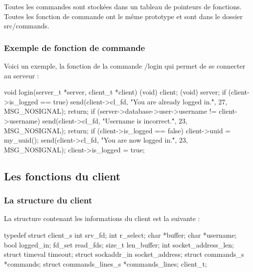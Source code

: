 \documentclass{report}
\begin{document}
Toutes les commandes sont stockées dans un tableau de pointeurs de fonctions. Toutes les fonction de commande ont le même prototype et sont dans le dossier src/commands.

\subsubsection{Exemple de fonction de commande}

Voici un exemple, la fonction de la commande /login qui permet de se connecter au serveur :

\begin{tcolorbox}[colback=black!75!white]
{\color{white}
\begin{markdown}
    void login(server_t *server, client_t *client)
    {
        (void) client;
        (void) server;
        if (client->is_logged == true) {
            send(client->cl_fd, "You are already logged in.\r", 27, MSG_NOSIGNAL);
            return;
        }
        if (server->database->user->username != client->username) {
            send(client->cl_fd, "Username is incorrect.\r", 23, MSG_NOSIGNAL);
            return;
        }
        if (client->is_logged == false) {
            client->uuid = my_uuid();
            send(client->cl_fd, "You are now logged in.\r", 23, MSG_NOSIGNAL);
            client->is_logged = true;
        }
    }
\end{markdown}
}
\end{tcolorbox}

\subsection{Les fonctions du client}

\subsubsection{La structure du client}

La structure contenant les informations du client est la suivante :

\begin{tcolorbox}[colback=black!75!white]
{\color{white}
\begin{markdown}
    typedef struct client_s {
        int srv_fd;
        int r_select;
        char *buffer;
        char *username;
        bool logged_in;
        fd_set read_fds;
        size_t len_buffer;
        int socket_address_len;
        struct timeval timeout;
        struct sockaddr_in socket_address;
        struct commands_s *commands;
        struct commands_lines_s *commands_lines;
    } client_t;
\end{markdown}
}
\end{tcolorbox}
\end{document}
